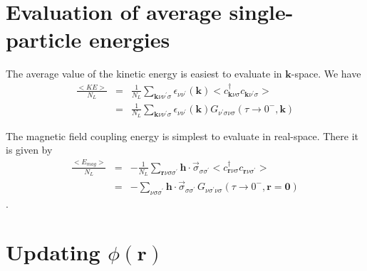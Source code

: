 \section{Evaluation of average single-particle energies}

The average value of the kinetic energy is easiest
to evaluate in $\mathbf{k}$-space.  We have
\begin{eqnarray}
\frac{<KE>}{N_L} & = & \frac{1}{N_L}
\sum_{\mathbf{k}\nu\nu^{\prime}\sigma} \epsilon_{\nu\nu^{\prime}}(\mathbf{k}) 
<c^{\dagger}_{\mathbf{k}\nu\sigma} c_{\mathbf{k}\nu^{\prime}\sigma}>
\\
& = & \frac{1}{N_L} \sum_{\mathbf{k}\nu\nu^{\prime}\sigma} 
\epsilon_{\nu\nu^{\prime}}(\mathbf{k}) 
G_{\nu^{\prime}\sigma \nu\sigma}(\tau \to 0^-, \mathbf{k}) 
\end{eqnarray}

The magnetic field coupling energy is simplest to evaluate
in real-space.  There it is given by
\begin{eqnarray}
\frac{<E_{mag}>}{N_L} & = & - \frac{1}{N_L} 
\sum_{\mathbf{r}\nu\sigma\sigma^{\prime}} \mathbf{h}\cdot 
\vec{\sigma}_{\sigma\sigma^{\prime}}
 <c^{\dagger}_{\mathbf{r}\nu\sigma} c_{\mathbf{r}\nu\sigma^{\prime}}>
 \\
& = & - \sum_{\nu\sigma\sigma^{\prime}} 
\mathbf{h}\cdot\vec{\sigma}_{\sigma\sigma^{\prime}}\,
G_{\nu\sigma^{\prime}\nu\sigma}(\tau \to 0^-,\mathbf{r} = \mathbf{0}) 
\end{eqnarray}.

\section{Updating $\phi(\mathbf{r})$}

